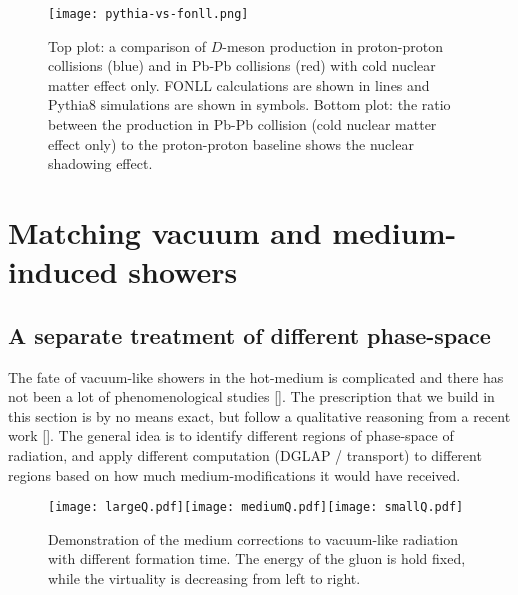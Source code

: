 \begin{figure}
\centering
\texttt{[image: pythia-vs-fonll.png]}
\caption{Top plot: a comparison of $D$-meson production in proton-proton collisions (blue) and in Pb-Pb collisions (red) with cold nuclear matter effect only. FONLL calculations are shown in lines and Pythia8 simulations are shown in symbols. Bottom plot: the ratio between the production in Pb-Pb collision (cold nuclear matter effect only) to the proton-proton baseline shows the nuclear shadowing effect.}
\label{fig:pythia-fonll}
\end{figure}

\section{Matching vacuum and medium-induced showers}
\subsection{A separate treatment of different phase-space}
\label{section:match}
The fate of vacuum-like showers in the hot-medium is complicated and there has not been a lot of phenomenological studies [].
The prescription that we build in this section is by no means exact, but follow a qualitative reasoning from a recent work [].
The general idea is to identify different regions of phase-space of radiation, and apply different computation (DGLAP / transport) to different regions based on how much medium-modifications it would have received.

\begin{figure}
\texttt{[image: largeQ.pdf]}\texttt{[image: mediumQ.pdf]}\texttt{[image: smallQ.pdf]}
\caption{Demonstration of the medium corrections to vacuum-like radiation with different formation time. The energy of the gluon is hold fixed, while the virtuality is decreasing from left to right.}
\label{fig:vac-med-interface}
\end{figure}

